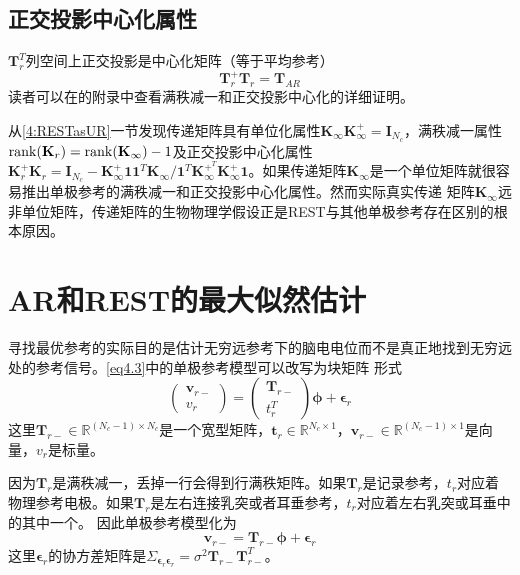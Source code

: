 \subsection{正交投影中心化属性} 
$\mathbf{T}_r^T$列空间上正交投影是中心化矩阵（等于平均参考）
\begin{equation}\label{eq4.14}
\mathbf{T}_r^+\mathbf{T}_r=\mathbf{T}_{AR}
\end{equation}
读者可以在\cite{hu_unified_2018}的附录中查看满秩减一和正交投影中心化的详细证明。

从\ref{4:RESTasUR}一节发现传递矩阵具有单位化属性$\mathbf{K}_{\infty}\mathbf{K}_{\infty}^+=\mathbf{I}_{N_c}$，满秩减一属性$\operatorname{rank}(\mathbf{K}_r)=\operatorname{rank}(\mathbf{K}_{\infty})-1$及正交投影中心化属性$\mathbf{K}_r^+\mathbf{K}_r=\mathbf{I}_{N_c}-\mathbf{K}_{\infty}^+\mathbf{11}^T\mathbf{K}_{\infty}/{\mathbf{1}^T\mathbf{K}_{\infty}^{+^T}\mathbf{K}_{\infty}^+\mathbf{1}}$。如果传递矩阵$\mathbf{K}_{\infty}$是一个单位矩阵就很容易推出单极参考的满秩减一和正交投影中心化属性。然而实际真实传递
矩阵$\mathbf{K}_{\infty}$远非单位矩阵，传递矩阵的生物物理学假设正是REST与其他单极参考存在区别的根本原因。

\section{AR和REST的最大似然估计}
寻找最优参考的实际目的是估计无穷远参考下的脑电电位而不是真正地找到无穷远处的参考信号。\eqref{eq4.3}中的单极参考模型可以改写为块矩阵
形式
\begin{equation}\label{eq4.15}
\begin{pmatrix}\mathbf{v}_{r-}\\v_r\end{pmatrix}=\begin{pmatrix}\mathbf{T}_{r-}\\t_r^T\end{pmatrix}\mathbf{\phi}+\mathbf{\epsilon}_r
\end{equation}
这里$\mathbf{T}_{r-}\in\mathbb{R}^{(N_c-1)\times{N_c}}$是一个宽型矩阵，$\mathbf{t}_r\in\mathbb{R}^{N_c\times1}$，$\mathbf{v}_{r-}\in\mathbb{R}^{(N_c-1)\times1}$是向量，$v_r$是标量。

因为$\mathbf{T}_r$是满秩减一，丢掉一行会得到行满秩矩阵。如果$\mathbf{T}_r$是记录参考，$t_r$对应着物理参考电极。如果$\mathbf{T}_r$是左右连接乳突或者耳垂参考，$t_r$对应着左右乳突或耳垂中的其中一个。 因此单极参考模型化为
\begin{equation}\label{eq4.16}
\mathbf{v}_{r-}=\mathbf{T}_{r-}\mathbf{\phi}+\mathbf{\epsilon}_r
\end{equation}
这里$\mathbf{\epsilon}_r$的协方差矩阵是$\Sigma_{\mathbf{\epsilon}_r\mathbf{\epsilon}_r}=\sigma^2\mathbf{T}_{r-}\mathbf{T}_{r-}^T$。

